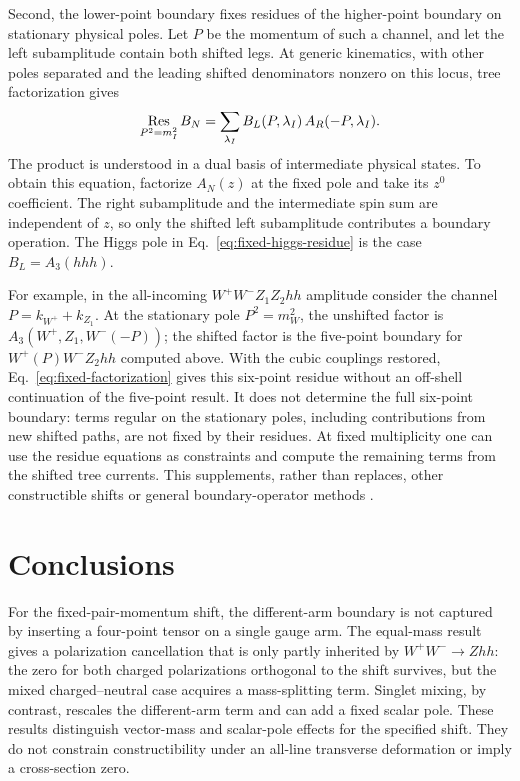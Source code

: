 \documentclass[11pt,a4paper]{article}
\begin{document}
Second, the lower-point boundary fixes residues of the higher-point
boundary on stationary physical poles. Let \(P\) be the momentum
of such a channel, and let the left subamplitude contain both
shifted legs. At generic kinematics, with other poles separated and
the leading shifted denominators nonzero on this locus, tree
factorization gives
\begin{equation}
 \mathop{\rm Res}_{P^2=m_I^2} B_N
 =\sum_{\lambda_I} B_L(P,\lambda_I)\, A_R(-P,\lambda_I).
 \label{eq:fixed-factorization}
\end{equation}
The product is understood in a dual basis of intermediate physical
states. To obtain this equation, factorize \(A_N(z)\) at the fixed
pole and take its \(z^0\) coefficient. The right subamplitude and the
intermediate spin sum are independent of \(z\), so only the shifted
left subamplitude contributes a boundary operation. The Higgs pole
in Eq.~\eqref{eq:fixed-higgs-residue} is the case \(B_L=A_3(hhh)\).

For example, in the all-incoming \(W^+W^-Z_1Z_2hh\) amplitude
consider the channel \(P=k_{W^+}+k_{Z_1}\). At the stationary
pole \(P^2=m_W^2\), the unshifted factor is
\(A_3(W^+,Z_1,W^-(-P))\); the shifted factor is the five-point
boundary for \(W^+(P)W^-Z_2hh\) computed above. With the cubic
couplings restored, Eq.~\eqref{eq:fixed-factorization} gives this
six-point residue without an off-shell continuation of the
five-point result. It does not determine the full six-point
boundary: terms regular on the stationary poles, including
contributions from new shifted paths, are not fixed by their
residues. At fixed multiplicity one can use the residue equations
as constraints and compute the remaining terms from the shifted
tree currents. This supplements, rather than replaces, other
constructible shifts or general boundary-operator methods
\cite{Ema,Jin}.

\section{Conclusions}
For the fixed-pair-momentum shift, the different-arm boundary is not
captured by inserting a four-point tensor on a single gauge arm. The
equal-mass result gives a polarization cancellation that is only
partly inherited by \(W^+W^-\to Zhh\): the zero for both charged
polarizations orthogonal to the shift survives, but the mixed
charged--neutral case acquires a mass-splitting term. Singlet mixing,
by contrast, rescales the different-arm term and can add a fixed
scalar pole. These results distinguish vector-mass and scalar-pole
effects for the specified shift. They do not constrain constructibility
under an all-line transverse deformation or imply a cross-section zero.
\end{document}
